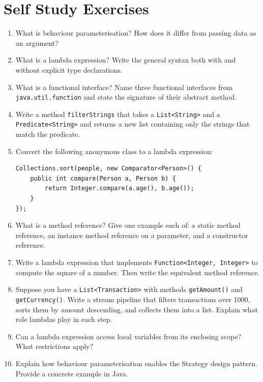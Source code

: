\documentclass[twoside=false,DIV=14]{scrartcl}
\begin{document}
\section*{Self Study Exercises}
\begin{enumerate}
\item What is behaviour parameterisation?  How does it differ from passing data as an argument?

\item What is a lambda expression?  Write the general syntax both with and without explicit type declarations.

\item What is a functional interface?  Name three functional interfaces from \texttt{java.util.function} and state the signature of their abstract method.

\item Write a method \texttt{filterStrings} that takes a \texttt{List<String>} and a \texttt{Predicate<String>} and returns a new list containing only the strings that match the predicate.

\item Convert the following anonymous class to a lambda expression:
\begin{verbatim}
Collections.sort(people, new Comparator<Person>() {
    public int compare(Person a, Person b) {
        return Integer.compare(a.age(), b.age());
    }
});
\end{verbatim}

\item What is a method reference?  Give one example each of: a static method reference, an instance method reference on a parameter, and a constructor reference.

\item Write a lambda expression that implements \texttt{Function<Integer, Integer>} to compute the square of a number.  Then write the equivalent method reference.

\item Suppose you have a \texttt{List<Transaction>} with methods \texttt{getAmount()} and \texttt{getCurrency()}.  Write a stream pipeline that filters transactions over 1000, sorts them by amount descending, and collects them into a list.  Explain what role lambdas play in each step.

\item Can a lambda expression access local variables from its enclosing scope?  What restrictions apply?

\item Explain how behaviour parameterisation enables the Strategy design pattern.  Provide a concrete example in Java.
\end{enumerate}
\end{document}
